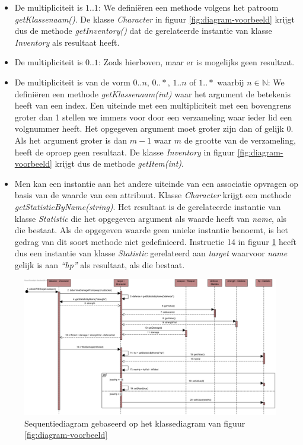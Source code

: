 \begin{itemize}
	\item De multipliciteit is $1..1$: We defini\"eren een methode volgens het patroom \textit{getKlassenaam()}. De klasse \textit{Character} in figuur \ref{fig:diagram-voorbeeld} krijgt dus de methode \textit{getInventory()} dat de gerelateerde instantie van klasse \textit{Inventory} als resultaat heeft.
	\item De multipliciteit is $0..1$: Zoals hierboven, maar er is mogelijks geen resultaat.
	\item De multipliciteit is van de vorm $0..n$, $0..*$, $1..n$ of $1..*$ waarbij $n \in \mathbb{N}$: We defini\"eren een methode \textit{getKlassenaam(int)} waar het argument de betekenis heeft van een index. Een uiteinde met een multipliciteit met een bovengrens groter dan 1 stellen we immers voor door een verzameling waar ieder lid een volgnummer heeft. Het opgegeven argument moet groter zijn dan of gelijk 0. Als het argument groter is dan $m - 1$ waar $m$ de grootte van de verzameling, heeft de oproep geen resultaat. De klasse \textit{Inventory} in figuur \ref{fig:diagram-voorbeeld} krijgt dus de methode \textit{getItem(int)}.
	\item Men kan een instantie aan het andere uiteinde van een associatie opvragen op basis van de waarde van een attribuut. Klasse \textit{Character} krijgt een methode \textit{getStatisticByName(string)}. Het resultaat is de gerelateerde instantie van klasse \textit{Statistic} die het opgegeven argument als waarde heeft van \textit{name}, als die bestaat. Als de opgegeven waarde geen unieke instantie benoemt, is het gedrag van dit soort methode niet gedefinieerd. Instructie 14 in figuur \ref{fig:seq-diagram-game} heeft dus een instantie van klasse \textit{Statistic} gerelateerd aan \textit{target} waarvoor \textit{name} gelijk is aan \textit{``hp''} als resultaat, als die bestaat.
\end{itemize}

\begin{figure}
	\includegraphics[height=0.55\textwidth]{chap-gedrag/seq-diagram-game.png}
	\caption{Sequentiediagram gebaseerd op het klassediagram van figuur \ref{fig:diagram-voorbeeld}}
	\label{fig:seq-diagram-game}
\end{figure}

